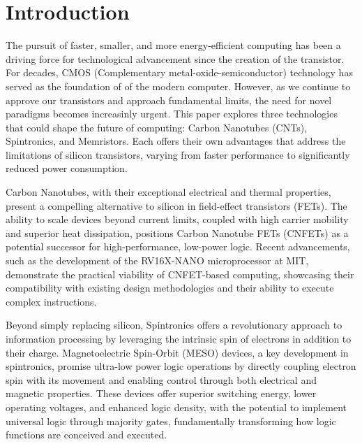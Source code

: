 \documentclass[sigconf,authordraft]{acmart}
\begin{document}

\maketitle

\section{Introduction}
The pursuit of faster, smaller, and more energy-efficient computing
has been a driving force for technological advancement since the 
creation of the transistor. For decades, CMOS (Complementary
metal-oxide-semiconductor) technology has served as the foundation 
of of the modern computer. However, as we continue to approve our 
transistors and approach fundamental limits, the need for novel 
paradigms becomes increasinly urgent. This paper explores three 
technologies that could shape the future of computing: Carbon Nanotubes
(CNTs), Spintronics, and Memristors. Each offers their own 
advantages that address the limitations of silicon transistors,
varying from faster performance to significantly reduced power 
consumption. 

Carbon Nanotubes, with their exceptional electrical and thermal 
properties, present a compelling alternative to silicon in 
field-effect transistors (FETs). The ability to scale devices 
beyond current limits, coupled with high carrier mobility and 
superior heat dissipation, positions Carbon Nanotube FETs (CNFETs) 
as a potential successor for high-performance, low-power logic. 
Recent advancements, such as the development of the RV16X-NANO 
microprocessor at MIT, demonstrate the practical viability of 
CNFET-based computing, showcasing their compatibility with 
existing design methodologies and their ability to execute 
complex instructions.

Beyond simply replacing silicon, Spintronics offers a 
revolutionary approach to information processing by leveraging 
the intrinsic spin of electrons in addition to their charge. 
Magnetoelectric Spin-Orbit (MESO) devices, a key development in 
spintronics, promise ultra-low power logic operations by directly 
coupling electron spin with its movement and enabling control 
through both electrical and magnetic properties. These devices 
offer superior switching energy, lower operating voltages, and 
enhanced logic density, with the potential to implement universal 
logic through majority gates, fundamentally transforming how logic 
functions are conceived and executed.
\end{document}
